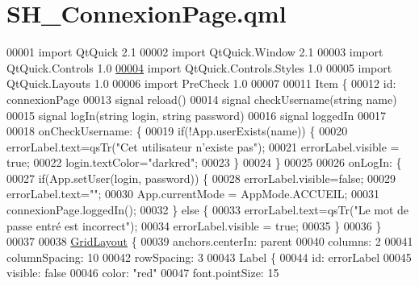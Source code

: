 \hypertarget{SH__ConnexionPage_8qml}{\section{S\-H\-\_\-\-Connexion\-Page.\-qml}
\label{SH__ConnexionPage_8qml}
}

\begin{DoxyCode}
00001 \textcolor{keyword}{import} QtQuick 2.1
00002 import QtQuick.Window 2.1
00003 import QtQuick.Controls 1.0
\hypertarget{SH__ConnexionPage_8qml_source_l00004}{}\hyperlink{classSH__ConnexionPage}{00004} import QtQuick.Controls.Styles 1.0
00005 import QtQuick.Layouts 1.0
00006 import PreCheck 1.0
00007 
00011 Item \{
00012     \textcolor{keywordtype}{id}: connexionPage
00013     signal reload()
00014     signal checkUsername(\textcolor{keywordtype}{string} name)
00015     signal logIn(\textcolor{keywordtype}{string} login, \textcolor{keywordtype}{string} password)
00016     signal loggedIn
00017 
00018     onCheckUsername: \{
00019         \textcolor{keywordflow}{if}(!App.userExists(name)) \{
00020             errorLabel.text=qsTr(\textcolor{stringliteral}{"Cet utilisateur n'existe pas"});
00021             errorLabel.visible = \textcolor{keyword}{true};
00022             login.textColor=\textcolor{stringliteral}{"darkred"};
00023         \}
00024     \}
00025 
00026     onLogIn: \{
00027         \textcolor{keywordflow}{if}(App.setUser(login, password)) \{
00028             errorLabel.visible=\textcolor{keyword}{false};
00029             errorLabel.text=\textcolor{stringliteral}{""};
00030             App.currentMode = AppMode.ACCUEIL;
00031             connexionPage.loggedIn();
00032         \} \textcolor{keywordflow}{else} \{
00033             errorLabel.text=qsTr(\textcolor{stringliteral}{"Le mot de passe entré est incorrect"});
00034             errorLabel.visible = \textcolor{keyword}{true};
00035         \}
00036     \}
00037 
00038     \hyperlink{classGridLayout}{GridLayout} \{
00039         anchors.centerIn: parent
00040         columns: 2
00041         columnSpacing: 10
00042         rowSpacing: 3
00043         Label \{
00044             \textcolor{keywordtype}{id}: errorLabel
00045             visible: \textcolor{keyword}{false}
00046             color: \textcolor{stringliteral}{"red"}
00047             font.pointSize: 15

\end{DoxyCode}
